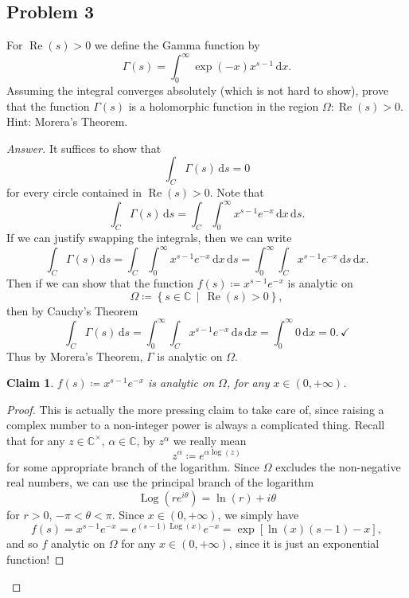 \documentclass[12pt]{article}
\newcommand{\cx}{\mathbb{C}}
\newcommand\paren[1]{\left( #1 \right)}
\newcommand\setb[1]{\left \{ #1 \right \}}
\newcommand{\sqbrack}[1]{\left [ #1 \right ]}
\renewcommand{\i}[4]{\int_{#1}^{#2} {#3} \, \mathrm{d} {#4} }
\newtheorem*{claim}{Claim}
\theoremstyle{definition}
\DeclareMathOperator\Log{Log}
\DeclareMathOperator\re{Re}
\begin{document}
\subsection{Problem 3}
For $\re(s) > 0$ we define the Gamma function by 
\[
    \Gamma(s) = \i{0}{\infty}{\exp(-x)x^{s-1}}{x} . 
\]
Assuming the integral converges absolutely (which is not hard to show), prove that the function $\Gamma(s)$ is a holomorphic function in the region $\Omega : \re(s) > 0$. Hint: Morera's Theorem. 
\begin{proof}[Answer]
    It suffices to show that 
    \[
        \i{C}{}{\Gamma(s)}{s} = 0
    \]
    for every circle contained in $\re(s) > 0$. Note that 
    \[
        \i{C}{}{\Gamma(s)}{s} = \i{C}{}{ \i{0}{\infty}{x^{s-1}e^{-x}}{x} }{s} . 
    \]
    If we can justify swapping the integrals, then we can write
    \begin{equation}\label{swap}
        \i{C}{}{\Gamma(s)}{s} = \i{C}{}{ \i{0}{\infty}{x^{s-1}e^{-x}}{x} }{s} = \i{0}{\infty}{ \i{C}{}{x^{s-1}e^{-x}}{s} }{x} . 
    \end{equation}
    Then if we can show that the function $f(s) \coloneqq x^{s-1} e^{-x}$ is analytic on 
    \[
        \Omega \coloneqq \setb{ s \in \cx \, \middle| \, \re(s) > 0 } ,  
    \]
    then by Cauchy's Theorem 
    \[
        \i{C}{}{\Gamma(s)}{s} = \i{0}{\infty}{ \i{C}{}{x^{s-1}e^{-x}}{s} }{x} = \i{0}{\infty}{ 0 }{x} = 0. \, \checkmark 
    \]
    Thus by Morera's Theorem, $\Gamma$ is analytic on $\Omega$. 
    \begin{claim}
        $f(s) \coloneqq x^{s-1} e^{-x}$ is analytic on $\Omega$, for any $x \in (0,+\infty)$. 
    \end{claim}
    \begin{proof}
        This is actually the more pressing claim to take care of, since raising a complex number to a non-integer power is always a complicated thing. Recall that for any $z \in \cx^{\times}$, $\alpha \in \cx$, by $z^{\alpha}$ we really mean 
        \[
            z^{\alpha} \coloneqq e^{\alpha \log(z)}
        \]
        for some appropriate branch of the logarithm. Since $\Omega$ excludes the non-negative real numbers, we can use the principal branch of the logarithm 
        \[
            \Log \paren{ re^{i\theta} } = \ln(r) + i\theta
        \]
        for $r > 0$, $-\pi < \theta < \pi$. Since $x \in (0,+\infty)$, we simply have 
        \[
            f(s) = x^{s-1} e^{-x} = e^{(s-1) \Log(x)} e^{-x} = \exp \sqbrack{ \ln(x) (s - 1) - x } , 
        \]
        and so $f$ analytic on $\Omega$ for any $x \in (0,+\infty)$, since it is just an exponential function!

\end{proof}
\end{proof}
\end{document}
